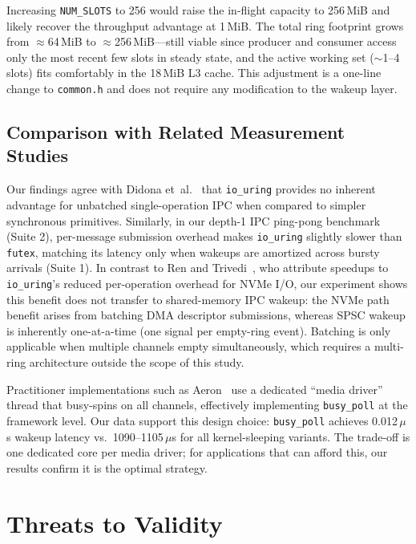 \documentclass[10pt,conference]{IEEEtran}
\begin{document}
Increasing \texttt{NUM\_SLOTS} to 256 would raise the in-flight capacity to
256\,MiB and likely recover the throughput advantage at 1\,MiB.  The total
ring footprint grows from $\approx$64\,MiB to $\approx$256\,MiB---still
viable since producer and consumer access only the most recent few slots in
steady state, and the active working set ($\sim$1--4 slots) fits comfortably
in the 18\,MiB L3 cache.  This adjustment is a one-line change to
\texttt{common.h} and does not require any modification to the wakeup layer.

\subsection{Comparison with Related Measurement Studies}

Our findings agree with Didona et~al.~\cite{didona2022} that \texttt{io\_uring}
provides no inherent advantage for unbatched single-operation IPC when compared
to simpler synchronous primitives. Similarly, in our depth-1 IPC ping-pong
benchmark (Suite 2), per-message submission overhead makes \texttt{io\_uring} slightly
slower than \texttt{futex}, matching its latency only when wakeups are amortized
across bursty arrivals (Suite 1).
In contrast to Ren and Trivedi~\cite{ren2023}, who attribute speedups to
\texttt{io\_uring}'s reduced per-operation overhead for NVMe I/O, our
experiment shows this benefit does not transfer to shared-memory IPC wakeup:
the NVMe path benefit arises from batching DMA descriptor submissions, whereas
SPSC wakeup is inherently one-at-a-time (one signal per empty-ring event).
Batching is only applicable when multiple channels empty simultaneously, which
requires a multi-ring architecture outside the scope of this study.

Practitioner implementations such as Aeron~\cite{disruptor} use a dedicated
``media driver'' thread that busy-spins on all channels, effectively
implementing \texttt{busy\_poll} at the framework level.  Our data support
this design choice: \texttt{busy\_poll} achieves 0.012\,$\mu$s wakeup latency
vs.\ 1090--1105\,$\mu$s for all kernel-sleeping variants.  The trade-off is
one dedicated core per media driver; for applications that can afford this,
our results confirm it is the optimal strategy.

\section{Threats to Validity}
\label{sec:threats}
\end{document}
